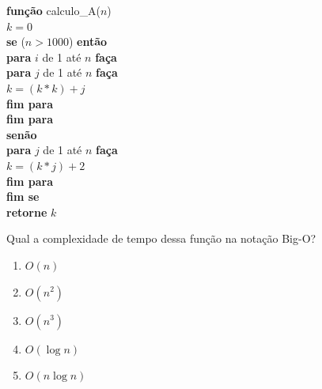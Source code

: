\documentclass[12pt]{article}
\begin{document}
\begin{enumerate}[label=\arabic*), leftmargin=1.5cm, itemsep=0.8cm]
    \begin{tcolorbox}[colback=white, colframe=black, fontupper=\small]
        \textbf{função} calculo\_A($n$) \\
        \hspace*{0.5cm} $k = 0$ \\
        \hspace*{0.5cm} \textbf{se} ($n > 1000$) \textbf{então} \\
        \hspace*{1.0cm} \textbf{para} $i$ de 1 até $n$ \textbf{faça} \\
        \hspace*{1.5cm} \textbf{para} $j$ de 1 até $n$ \textbf{faça} \\
        \hspace*{2.0cm} $k = (k * k) + j$ \\
        \hspace*{1.5cm} \textbf{fim para} \\
        \hspace*{1.0cm} \textbf{fim para} \\
        \hspace*{0.5cm} \textbf{senão} \\
        \hspace*{1.0cm} \textbf{para} $j$ de 1 até $n$ \textbf{faça} \\
        \hspace*{1.5cm} $k = (k * j) + 2$ \\
        \hspace*{1.0cm} \textbf{fim para} \\
        \hspace*{0.5cm} \textbf{fim se} \\
        \hspace*{0.5cm} \textbf{retorne} $k$
    \end{tcolorbox}
    
    Qual a complexidade de tempo dessa função na notação Big-O?
    
    \begin{enumerate}[label=\Alph*)]
        \item $O(n)$
        \item $O(n^2)$
        \item $O(n^3)$
        \item $O(\log n)$
        \item $O(n \log n)$
    \end{enumerate}

\end{enumerate}
\end{document}
